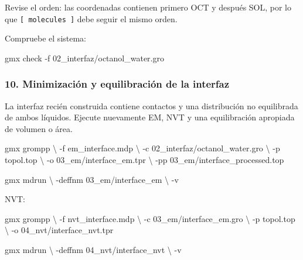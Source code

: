 \documentclass[
  spanish,
  11pt,
  a4paper]{article}
\newenvironment{Shaded}{\begin{snugshade}}{\end{snugshade}}
\newcommand{\AttributeTok}[1]{\textcolor[rgb]{0.13,0.29,0.53}{#1}}
\newcommand{\DataTypeTok}[1]{\textcolor[rgb]{0.13,0.29,0.53}{#1}}
\newcommand{\ExtensionTok}[1]{#1}
\newcommand{\NormalTok}[1]{#1}
\begin{document}
Revise el orden: las coordenadas contienen primero OCT y después SOL,
por lo que \texttt{{[}\ molecules\ {]}} debe seguir el mismo orden.

Compruebe el sistema:

\begin{Shaded}
\begin{Highlighting}[]
\ExtensionTok{gmx}\NormalTok{ check }\AttributeTok{{-}f}\NormalTok{ 02\_interfaz/octanol\_water.gro}
\end{Highlighting}
\end{Shaded}

\subsubsection{10. Minimización y equilibración de la
interfaz}\label{minimizaciuxf3n-y-equilibraciuxf3n-de-la-interfaz}

La interfaz recién construida contiene contactos y una distribución no
equilibrada de ambos líquidos. Ejecute nuevamente EM, NVT y una
equilibración apropiada de volumen o área.

\begin{Shaded}
\begin{Highlighting}[]
\ExtensionTok{gmx}\NormalTok{ grompp }\DataTypeTok{\textbackslash{}}
    \AttributeTok{{-}f}\NormalTok{ em\_interface.mdp }\DataTypeTok{\textbackslash{}}
    \AttributeTok{{-}c}\NormalTok{ 02\_interfaz/octanol\_water.gro }\DataTypeTok{\textbackslash{}}
    \AttributeTok{{-}p}\NormalTok{ topol.top }\DataTypeTok{\textbackslash{}}
    \AttributeTok{{-}o}\NormalTok{ 03\_em/interface\_em.tpr }\DataTypeTok{\textbackslash{}}
    \AttributeTok{{-}pp}\NormalTok{ 03\_em/interface\_processed.top}

\ExtensionTok{gmx}\NormalTok{ mdrun }\DataTypeTok{\textbackslash{}}
    \AttributeTok{{-}deffnm}\NormalTok{ 03\_em/interface\_em }\DataTypeTok{\textbackslash{}}
    \AttributeTok{{-}v}
\end{Highlighting}
\end{Shaded}

NVT:

\begin{Shaded}
\begin{Highlighting}[]
\ExtensionTok{gmx}\NormalTok{ grompp }\DataTypeTok{\textbackslash{}}
    \AttributeTok{{-}f}\NormalTok{ nvt\_interface.mdp }\DataTypeTok{\textbackslash{}}
    \AttributeTok{{-}c}\NormalTok{ 03\_em/interface\_em.gro }\DataTypeTok{\textbackslash{}}
    \AttributeTok{{-}p}\NormalTok{ topol.top }\DataTypeTok{\textbackslash{}}
    \AttributeTok{{-}o}\NormalTok{ 04\_nvt/interface\_nvt.tpr}

\ExtensionTok{gmx}\NormalTok{ mdrun }\DataTypeTok{\textbackslash{}}
    \AttributeTok{{-}deffnm}\NormalTok{ 04\_nvt/interface\_nvt }\DataTypeTok{\textbackslash{}}
    \AttributeTok{{-}v}
\end{Highlighting}
\end{Shaded}
\end{document}
